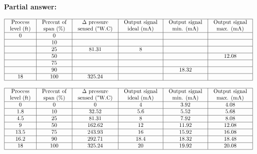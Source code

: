 
\noindent
{\bf Partial answer:}


$$\vbox{\offinterlineskip
\halign{\strut
\vrule \quad\hfil # \ \hfil & 
\vrule \quad\hfil # \ \hfil & 
\vrule \quad\hfil # \ \hfil & 
\vrule \quad\hfil # \ \hfil & 
\vrule \quad\hfil # \ \hfil & 
\vrule \quad\hfil # \ \hfil \vrule \cr
\noalign{\hrule}
%
Process & Percent of & $\Delta$ pressure & Output signal & Output signal & Output signal \cr
%
level (ft) & span (\%) & sensed ("W.C) & ideal (mA) & min. (mA) & max. (mA) \cr
%
\noalign{\hrule}
%
0  & 0 &  &  &  &  \cr
%
\noalign{\hrule}
%
  & 10 &  &  &  &  \cr
%
\noalign{\hrule}
%
  & 25 & 81.31 & 8 &  &  \cr
%
\noalign{\hrule}
%
  & 50 &  &  &  & 12.08 \cr
%
\noalign{\hrule}
%
  & 75 &  &  &  &  \cr
%
\noalign{\hrule}
%
  & 90 &  &  & 18.32 &  \cr
%
\noalign{\hrule}
%
18 & 100 & 325.24 &  &  &  \cr
%
\noalign{\hrule}
} %
}$$ %








$$\vbox{\offinterlineskip
\halign{\strut
\vrule \quad\hfil # \ \hfil & 
\vrule \quad\hfil # \ \hfil & 
\vrule \quad\hfil # \ \hfil & 
\vrule \quad\hfil # \ \hfil & 
\vrule \quad\hfil # \ \hfil & 
\vrule \quad\hfil # \ \hfil \vrule \cr
\noalign{\hrule}
%
Process & Percent of & $\Delta$ pressure & Output signal & Output signal & Output signal \cr
%
level (ft) & span (\%) & sensed ("W.C) & ideal (mA) & min. (mA) & max. (mA) \cr
%
\noalign{\hrule}
%
0 & 0 & 0 & 4 & 3.92 & 4.08 \cr
%
\noalign{\hrule}
%
1.8 & 10 & 32.52 & 5.6 & 5.52 & 5.68 \cr
%
\noalign{\hrule}
%
4.5 & 25 & 81.31 & 8 & 7.92 & 8.08 \cr
%
\noalign{\hrule}
%
9 & 50 & 162.62 & 12 & 11.92 & 12.08 \cr
%
\noalign{\hrule}
%
13.5 & 75 & 243.93 & 16 & 15.92 & 16.08 \cr
%
\noalign{\hrule}
%
16.2 & 90 & 292.71 & 18.4 & 18.32 & 18.48 \cr
%
\noalign{\hrule}
%
18 & 100 & 325.24 & 20 & 19.92 & 20.08 \cr
%
\noalign{\hrule}
} %
}$$ %






